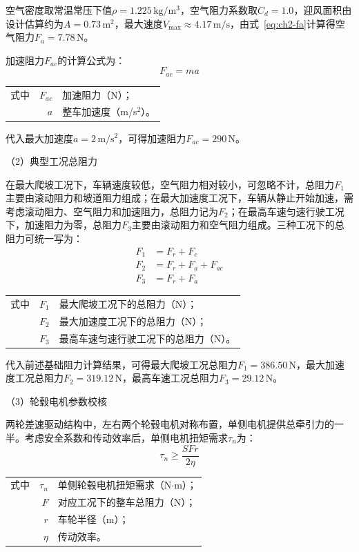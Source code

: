 空气密度取常温常压下值$\rho=1.225\,\mathrm{kg/m^3}$，空气阻力系数取$C_d=1.0$，迎风面积由设计估算约为$A=0.73\,\mathrm{m^2}$，最大速度$V_{\max}\approx4.17\,\mathrm{m/s}$，由式~\eqref{eq:ch2-fa}计算得空气阻力$F_a=7.78\,\mathrm{N}$。

加速阻力$F_{ac}$的计算公式为：
\begin{equation}
F_{ac} = m a
\label{eq:ch2-fac}
\end{equation}
\begin{tabularx}{\textwidth}{@{}l@{\quad}r@{———}X@{}}
式中& $F_{ac}$ & 加速阻力（N）；\\
& $a$ & 整车加速度（m/s$^2$）。\\
\end{tabularx}\vspace{3.15bp}

代入最大加速度$a=2\,\mathrm{m/s^2}$，可得加速阻力$F_{ac}=290\,\mathrm{N}$。

（2）典型工况总阻力

在最大爬坡工况下，车辆速度较低，空气阻力相对较小，可忽略不计，总阻力$F_1$主要由滚动阻力和坡道阻力组成；在最大加速度工况下，车辆从静止开始加速，需考虑滚动阻力、空气阻力和加速阻力，总阻力记为$F_2$；在最高车速匀速行驶工况下，加速阻力为零，总阻力$F_3$主要由滚动阻力和空气阻力组成。三种工况下的总阻力可统一写为：
\begin{align}
F_1 &= F_r + F_c
\label{eq:ch2-f1}\\
F_2 &= F_r + F_a + F_{ac}
\label{eq:ch2-f2}\\
F_3 &= F_r + F_a
\label{eq:ch2-f3}
\end{align}
\begin{tabularx}{\textwidth}{@{}l@{\quad}r@{———}X@{}}
式中& $F_1$ & 最大爬坡工况下的总阻力（N）；\\
& $F_2$ & 最大加速度工况下的总阻力（N）；\\
& $F_3$ & 最高车速匀速行驶工况下的总阻力（N）。\\
\end{tabularx}\vspace{3.15bp}

代入前述基础阻力计算结果，可得最大爬坡工况总阻力$F_1=386.50\,\mathrm{N}$，最大加速度工况总阻力$F_2=319.12\,\mathrm{N}$，最高车速工况总阻力$F_3=29.12\,\mathrm{N}$。

（3）轮毂电机参数校核

两轮差速驱动结构中，左右两个轮毂电机对称布置，单侧电机提供总牵引力的一半。考虑安全系数和传动效率后，单侧电机扭矩需求$\tau_n$为：
\begin{equation}
\tau_n \geq \frac{S F r}{2 \eta}
\label{eq:ch2-hub-torque}
\end{equation}
\begin{tabularx}{\textwidth}{@{}l@{\quad}r@{———}X@{}}
式中& $\tau_n$ & 单侧轮毂电机扭矩需求（N$\cdot$m）；\\
& $F$ & 对应工况下的整车总阻力（N）；\\
& $r$ & 车轮半径（m）；\\
& $\eta$ & 传动效率。\\
\end{tabularx}\vspace{3.15bp}

